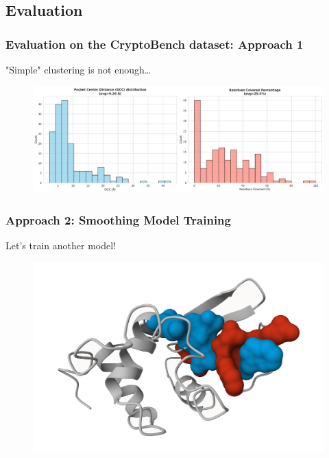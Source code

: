 \documentclass[aspectratio=169]{beamer}
\begin{document}
\subsection{Evaluation}

\begin{frame}
  \frametitle{Evaluation on the CryptoBench dataset: Approach 1}

  "Simple" clustering is not enough\dots

  \begin{figure}
    \includegraphics[width=\textwidth]{fig/non-smoothened-1.pdf}
  \end{figure}
\end{frame}

\begin{frame}
  \frametitle{Approach 2: Smoothing Model Training}

  Let's train another model!

  \begin{figure}
    \centering
    \includegraphics[width=\linewidth,height=0.8\textheight,keepaspectratio]{fig/smoothing-difference.png}
  \end{figure}
\end{frame}
\end{document}
